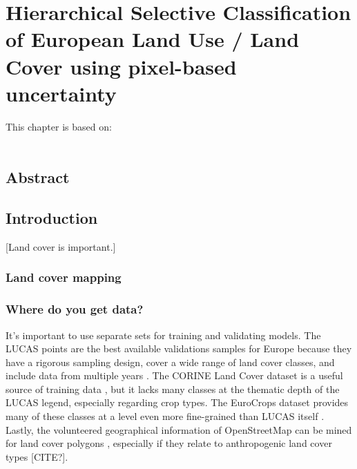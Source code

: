 \chapter[Hierarchical Selective Classification]{Hierarchical Selective Classification of European Land Use / Land Cover using pixel-based uncertainty}
\label{cha:chapter4}
\vspace*{\fill}
This chapter is based on:
\\
\\
\newpage

\section*{Abstract}


\newpage

\section{Introduction}
[Land cover is important.]

\subsection{Land cover mapping}

    \subsection{Where do you get data?}

        It's important to use separate sets for training and validating models. The LUCAS points are the best available validations samples for Europe because they have a rigorous sampling design, cover a wide range of land cover classes, and include data from multiple years \citep{dandrimont2020harmonised,dandrimont2021lucas,venter2022global}. The CORINE Land Cover dataset is a useful source of training data \citep{witjes2022spatiotemporal,witjes2024iterative}, but it lacks many classes at the thematic depth of the LUCAS legend, especially regarding crop types.
        The EuroCrops dataset provides many of these classes at a level even more fine-grained than LUCAS itself \citep{schneider2023eurocrops}. Lastly, the volunteered geographical information of OpenStreetMap can be mined for land cover polygons \citep{witjes2022spatiotemporal}, especially if they relate to anthropogenic land cover types [CITE?]. 
        
